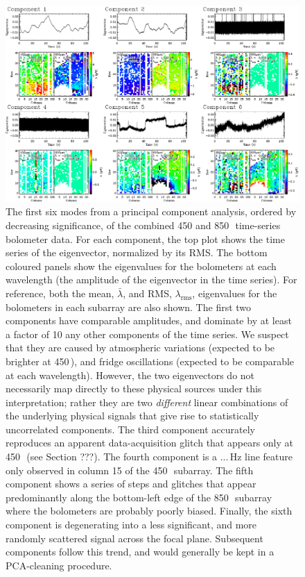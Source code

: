 \documentclass[useAMS,usenatbib,nofootinbib]{mn2e}
\newcommand{\rms}{RMS}
\begin{document}
\begin{figure}
\centering
\includegraphics[width=\linewidth]{pca.pdf}
\caption{The first six modes from a principal component analysis,
  ordered by decreasing significance, of the combined 450 and
  850\,\micron\ time-series bolometer data. For each component, the
  top plot shows the time series of the eigenvector, normalized by its
  \rms. The bottom coloured panels show the eigenvalues for the
  bolometers at each wavelength (the amplitude of the eigenvector in
  the time series). For reference, both the mean, $\bar{\lambda}$, and
  \rms, $\lambda_\mathrm{rms}$, eigenvalues for the bolometers in each
  subarray are also shown. The first two components have comparable
  amplitudes, and dominate by at least a factor of 10 any other
  components of the time series. We suspect that they are caused by
  atmospheric variations (expected to be brighter at 450\,\micron),
  and fridge oscillations (expected to be comparable at each
  wavelength). However, the two eigenvectors do not necessarily map
  directly to these physical sources under this interpretation; rather
  they are two \emph{different} linear combinations of the underlying
  physical signals that give rise to statistically uncorrelated
  components. The third component accurately reproduces an apparent
  data-acquisition glitch that appears only at 450\,\micron\ (see
  Section ???). The fourth component is a ...\,Hz line feature only
  observed in column 15 of the 450\,\micron\ subarray. The fifth
  component shows a series of steps and glitches that appear
  predominantly along the bottom-left edge of the 850\,\micron\
  subarray where the bolometers are probably poorly biased. Finally,
  the sixth component is degenerating into a less significant, and
  more randomly scattered signal across the focal plane. Subsequent
  components follow this trend, and would generally be kept in a
  PCA-cleaning procedure.}
\label{fig:pca}
\end{figure}
\end{document}

